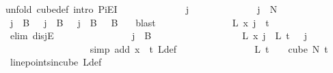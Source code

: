 \begin{isabellebody}
{\isacharparenleft}{\kern0pt}unfold\ cube{\isacharunderscore}{\kern0pt}def{\isacharcomma}{\kern0pt}\ intro\ PiE{\isacharunderscore}{\kern0pt}I{\isacharparenright}{\kern0pt}\isanewline
\ \ \ \ \ \ \ \ \ \ \ \ \isamarkupfalse%
\ j\isanewline
\ \ \ \ \ \ \ \ \ \ \ \ \isamarkupfalse%
\ {\isachardoublequoteopen}j\ {\isasymin}\ {\isacharbraceleft}{\kern0pt}{\isachardot}{\kern0pt}{\isachardot}{\kern0pt}{\isacharless}{\kern0pt}N{\isacharprime}{\kern0pt}{\isacharbraceright}{\kern0pt}{\isachardoublequoteclose}\isanewline
\ \ \ \ \ \ \ \ \ \ \ \ \isamarkupfalse%
\ {\isachardoublequoteopen}j\ {\isasymin}\ B\ {}\ {\isasymor}\ j\ {\isasymin}\ B\ {}\ {\isasymor}\ j\ {\isasymnotin}\ {\isacharparenleft}{\kern0pt}B\ {}\ {\isasymunion}\ B\ {}{\isacharparenright}{\kern0pt}{\isachardoublequoteclose}\ \isamarkupfalse%
\ blast\isanewline
\ \ \ \ \ \ \ \ \ \ \ \ \isamarkupfalse%
\ \isamarkupfalse%
\ {\isachardoublequoteopen}L{\isacharprime}{\kern0pt}\ x\ j\ {\isasymin}\ {\isacharbraceleft}{\kern0pt}{\isachardot}{\kern0pt}{\isachardot}{\kern0pt}{\isacharless}{\kern0pt}t\ {\isacharplus}{\kern0pt}\ {}{\isacharbraceright}{\kern0pt}{\isachardoublequoteclose}\isanewline
\ \ \ \ \ \ \ \ \ \ \ \ \isamarkupfalse%
\ {\isacharparenleft}{\kern0pt}elim\ disjE{\isacharparenright}{\kern0pt}\isanewline
\ \ \ \ \ \ \ \ \ \ \ \ \ \ \isamarkupfalse%
\ {\isachardoublequoteopen}j\ {\isasymin}\ B\ {}{\isachardoublequoteclose}\isanewline
\ \ \ \ \ \ \ \ \ \ \ \ \ \ \isamarkupfalse%
\ \isamarkupfalse%
\ {\isachardoublequoteopen}L{\isacharprime}{\kern0pt}\ x\ j\ {\isacharequal}{\kern0pt}\ L\ {\isacharparenleft}{\kern0pt}t\ {\isacharminus}{\kern0pt}\ {}{\isacharparenright}{\kern0pt}\ j{\isachardoublequoteclose}\ \isanewline
\ \ \ \ \ \ \ \ \ \ \ \ \ \ \ \ \isamarkupfalse%
\ {\isacharparenleft}{\kern0pt}simp\ add{\isacharcolon}{\kern0pt}\ {\isacartoucheopen}x\ {\isacharequal}{\kern0pt}\ t{\isacartoucheclose}\ L{\isacharprime}{\kern0pt}{\isacharunderscore}{\kern0pt}def{\isacharparenright}{\kern0pt}\isanewline
\ \ \ \ \ \ \ \ \ \ \ \ \ \ \isamarkupfalse%
\ {\isachardoublequoteopen}L\ {\isacharparenleft}{\kern0pt}t\ {\isacharminus}{\kern0pt}\ {}{\isacharparenright}{\kern0pt}\ {\isasymin}\ cube\ N{\isacharprime}{\kern0pt}\ t{\isachardoublequoteclose}\ \isamarkupfalse%
\ line{\isacharunderscore}{\kern0pt}points{\isacharunderscore}{\kern0pt}in{\isacharunderscore}{\kern0pt}cube\ L{\isacharunderscore}{\kern0pt}def\ \isanewline

\end{isabellebody}
